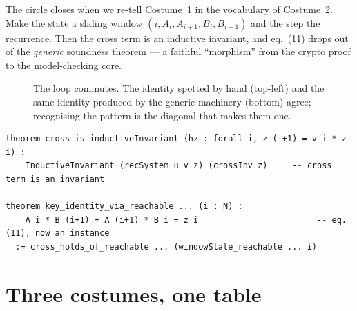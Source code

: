 \documentclass[runningheads]{llncs}
\begin{document}
The circle closes when we re-tell Costume~1 in the vocabulary of Costume~2. Make
the state a sliding window $(i,A_i,A_{i+1},B_i,B_{i+1})$ and the step the
recurrence. Then the cross term is an inductive invariant, and eq.~(11) drops out
of the \emph{generic} soundness theorem --- a faithful ``morphism'' from the
crypto proof to the model-checking core.

\begin{figure}[H]
\centering
{}
\caption{The loop commutes. The identity spotted by hand (top-left) and the same
identity produced by the generic machinery (bottom) agree; recognising the
pattern is the diagonal that makes them one.}
\label{fig:loop}
\end{figure}

\begin{lstlisting}[style=lean]
theorem cross_is_inductiveInvariant (hz : forall i, z (i+1) = v i * z i) :
    InductiveInvariant (recSystem u v z) (crossInv z)     -- cross term is an invariant

theorem key_identity_via_reachable ... (i : N) :
    A i * B (i+1) + A (i+1) * B i = z i                        -- eq. (11), now an instance
  := cross_holds_of_reachable ... (windowState_reachable ... i)
\end{lstlisting}

\section{Three costumes, one table}
\end{document}
